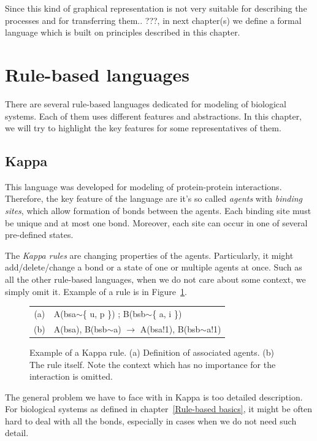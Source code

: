 \documentclass[12pt]{fithesis2}
\begin{document}
Since this kind of graphical representation is not very suitable for describing the processes and for transferring them.. ???, in next chapter(s) we define a formal language which is built on principles described in this chapter.

\section{Rule-based languages}

There are several rule-based languages dedicated for modeling of biological systems. Each of them uses different features and abstractions. In this chapter, we will try to highlight the key features for some representatives of them.

\subsection{Kappa}
\label{kappa}

This language was developed for modeling of protein-protein interactions. Therefore, the key feature of the language are it's so called \textit{agents} with \textit{binding sites}, which allow formation of bonds between the agents. Each binding site must be unique and at most one bond. Moreover, each site can occur in one of several pre-defined states.

The \textit{Kappa rules} are changing properties of the agents. Particularly, it might add/delete/change a bond or a state of one or multiple agents at once. Such as all the other rule-based languages, when we do not care about some context, we simply omit it. Example of a rule is in Figure~\ref{kappa-rule}.

\begin{figure}
\begin{center}
\begin{tabular}{c l}
(a) & A(bsa$\sim$\{ u, p \}) ; B(bsb$\sim$\{ a, i \}) \\
(b) & A(bsa), B(bsb$\sim$a) $\rightarrow$ A(bsa!1), B(bsb$\sim$a!1) \\
\end{tabular}
\end{center}
\caption{Example of a Kappa rule. (a) Definition of associated agents. (b) The rule itself. Note the context which has no importance for the interaction is omitted.}\label{kappa-rule}
\end{figure}

The general problem we have to face with in Kappa is too detailed description. For biological systems as defined in chapter~\ref{Rule-based basics}, it might be often hard to deal with all the bonds, especially in cases when we do not need such detail.
\end{document}
